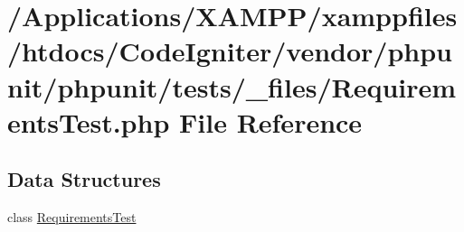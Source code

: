\hypertarget{_requirements_test_8php}{}\section{/\+Applications/\+X\+A\+M\+P\+P/xamppfiles/htdocs/\+Code\+Igniter/vendor/phpunit/phpunit/tests/\+\_\+files/\+Requirements\+Test.php File Reference}
\label{_requirements_test_8php}
\subsection*{Data Structures}
\begin{DoxyCompactItemize}
\item 
class \mbox{\hyperlink{class_requirements_test}{Requirements\+Test}}
\end{DoxyCompactItemize}
